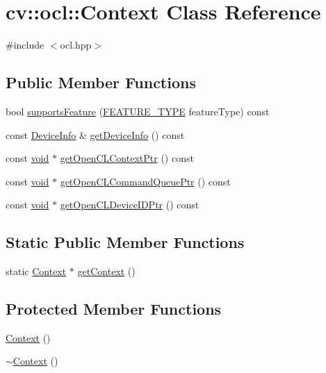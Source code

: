 \hypertarget{classcv_1_1ocl_1_1Context}{\section{cv\-:\-:ocl\-:\-:Context Class Reference}
\label{classcv_1_1ocl_1_1Context}
}


{\ttfamily \#include $<$ocl.\-hpp$>$}

\subsection*{Public Member Functions}
\begin{DoxyCompactItemize}
\item 
bool \hyperlink{classcv_1_1ocl_1_1Context_a8c1023a50ac9a80304aabf2eca06e38e}{supports\-Feature} (\hyperlink{namespacecv_1_1ocl_ae54de1c75af5695402df00cf3baa7be0}{F\-E\-A\-T\-U\-R\-E\-\_\-\-T\-Y\-P\-E} feature\-Type) const 
\item 
const \hyperlink{structcv_1_1ocl_1_1DeviceInfo}{Device\-Info} \& \hyperlink{classcv_1_1ocl_1_1Context_a4a6c0a7250409ec034d8e22f0be930ef}{get\-Device\-Info} () const 
\item 
const \hyperlink{legacy_8hpp_a8bb47f092d473522721002c86c13b94e}{void} $\ast$ \hyperlink{classcv_1_1ocl_1_1Context_a0b6f4bd12a68ab357846012a08ebbd23}{get\-Open\-C\-L\-Context\-Ptr} () const 
\item 
const \hyperlink{legacy_8hpp_a8bb47f092d473522721002c86c13b94e}{void} $\ast$ \hyperlink{classcv_1_1ocl_1_1Context_a7f5b3c7493ea126f5a8c66cfe4b4200a}{get\-Open\-C\-L\-Command\-Queue\-Ptr} () const 
\item 
const \hyperlink{legacy_8hpp_a8bb47f092d473522721002c86c13b94e}{void} $\ast$ \hyperlink{classcv_1_1ocl_1_1Context_ae884ac4505b30eda72cae9c99562bf2b}{get\-Open\-C\-L\-Device\-I\-D\-Ptr} () const 
\end{DoxyCompactItemize}
\subsection*{Static Public Member Functions}
\begin{DoxyCompactItemize}
\item 
static \hyperlink{classcv_1_1ocl_1_1Context}{Context} $\ast$ \hyperlink{classcv_1_1ocl_1_1Context_a8d5b2af02b94e41137d958f448492eb9}{get\-Context} ()
\end{DoxyCompactItemize}
\subsection*{Protected Member Functions}
\begin{DoxyCompactItemize}
\item 
\hyperlink{classcv_1_1ocl_1_1Context_a2474d50e89eef07e34e82bcb5067ca8a}{Context} ()
\item 
\hyperlink{classcv_1_1ocl_1_1Context_aee92207979185b1061db60667a0c22cf}{$\sim$\-Context} ()
\end{DoxyCompactItemize}


